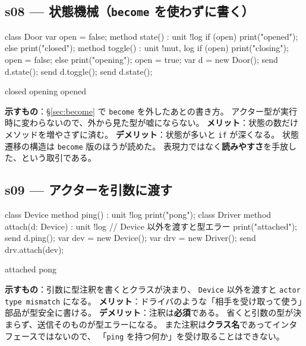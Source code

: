 \documentclass[11pt,a4paper]{ltjsarticle}
\theoremstyle{definition}
\theoremstyle{remark}
\begin{document}
\subsection{s08 --- 状態機械（\texttt{become} を使わずに書く）}
\begin{aipl}
class Door {
  var open = false;
  method state() : unit !{log} {
    if (open) { print("opened"); } else { print("closed"); }
  }
  method toggle() : unit !{mut, log} {
    if (open) { print("closing"); open = false; }
    else      { print("opening"); open = true; }
  }
}
var d = new Door();
send d.state();
send d.toggle();
send d.state();
\end{aipl}
\begin{term}
closed
opening
opened
\end{term}
\textbf{示すもの}：\S\ref{sec:become} で \texttt{become} を外したあとの書き方。
アクター型が実行時に変わらないので、外から見た型が嘘にならない。
\textbf{メリット}：状態の数だけメソッドを増やさずに済む。
\textbf{デメリット}：状態が多いと \texttt{if} が深くなる。
状態遷移の構造は \texttt{become} 版のほうが読めた。
表現力ではなく\textbf{読みやすさ}を手放した、という取引である。

\subsection{s09 --- アクターを引数に渡す}
\begin{aipl}
class Device { method ping() : unit !{log} { print("pong"); } }
class Driver {
  method attach(d: Device) : unit !{log} {   // Device 以外を渡すと型エラー
    print("attached");
    send d.ping();
  }
}
var dev = new Device();
var drv = new Driver();
send drv.attach(dev);
\end{aipl}
\begin{term}
attached
pong
\end{term}
\textbf{示すもの}：引数に型注釈を書くとクラスが決まり、
\texttt{Device} 以外を渡すと \texttt{actor type mismatch} になる。
\textbf{メリット}：ドライバのような「相手を受け取って使う」部品が型安全に書ける。
\textbf{デメリット}：注釈は\textbf{必須}である。
省くと引数の型が決まらず、送信そのものが型エラーになる。
また注釈は\textbf{クラス名}であってインタフェースではないので、
「\texttt{ping} を持つ何か」を受け取ることはできない。
\end{document}
